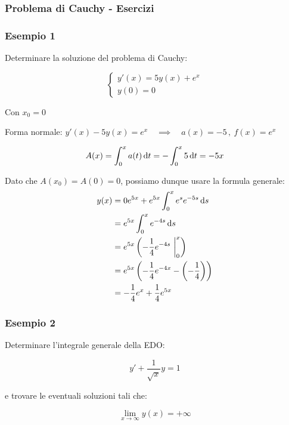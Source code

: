 
\filbreak{}
\subsubsection*{Problema di Cauchy {-} Esercizi}

\subsubsection*{Esempio 1}

Determinare la soluzione del problema di Cauchy:

\begin{equation*}
    \begin{cases}
        y'(x) = 5y(x) + e^{x} \\
        y(0) = 0
    \end{cases}
\end{equation*}

Con \(x_0 = 0\)

Forma normale: \(y'(x) -5y(x) = e^x \quad \implies \quad a(x) = -5\,,\ f(x) = e^x\)

\[A(x) = \int_{{0}}^{{x}} a(t) \mathop{}\!\mathrm{d} t = - \int_{{0}}^{{x}} 5 \mathop{}\!\mathrm{d} t = -5x\]

Dato che \(A(x_0) = A(0) = 0\), possiamo dunque usare la formula generale:
\begin{align*}
    y(x) & =0e^{5x} + e^{5x}\int_{{0}}^{{x}} e^{s} e^{-5s} \mathop{}\!\mathrm{d} s                    \\
         & = e^{5x}\int_{{0}}^{{x}} e^{-4s} \mathop{}\!\mathrm{d} s                                   \\
         & = e^{5x} \left( -\frac{1}{4} e^{-4s}\ \bigg|_{0}^{x} \right)               \\
         & = e^{5x} \left( -\frac{1}{4} e^{-4x} - \left( -\frac{1}{4} \right) \right) \\
         & = - \frac{1}{4} e^{x}+ \frac{1}{4} e^{5x}
\end{align*}

\filbreak{}

\subsubsection*{Esempio 2}

Determinare l'integrale generale della EDO:

\[
    y'+\frac{1}{\sqrt{x}} y=1
\]

e trovare le eventuali soluzioni tali che:

\[
    \lim_{x \to \infty} y(x) = +\infty
\]

